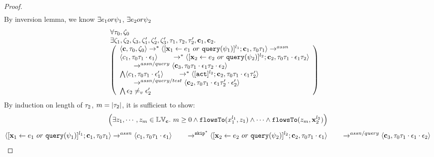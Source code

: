 \documentclass[a4paper,11pt]{article}
\begin{document}
\begin{proof}
\[\begin{array}{ll}
&
\end{array}
 \]
 By inversion lemma, we know $\exists e_1 or \psi_1$, $\exists e_2 or \psi_2$
 \[
\begin{array}{ll}
\begin{array}{l}
\forall \vtrace_0, \vcounter_0
\\
\exists \vcounter_1, \vcounter_2, \vcounter_3,
\vcounter_1', \vcounter_2', \vcounter_3', 
\vtrace_1, \vtrace_2, \vtrace_2', \ssa{c}_1, \ssa{c}_2.
\\
  \left(
  \begin{array}{l}   
\config{\ssa{c}, \vtrace_0, \vcounter_0} \rightarrow^{*} 
\config{[\assign{\ssa{x}_1}{\expr_1~ or ~ \query(\qexpr_1)}]^{l_1} ; \ssa{c}_1, \vtrace_0 \vtrace_1}  \rightarrow^{assn}
\\ 
 \config{c_1, \vtrace_0 \vtrace_1 \cdot \event_1} 
  \qquad \rightarrow^{*} 
  \config{[\assign{\ssa{x}_2}{\expr_2 ~ or ~ \query(\qexpr_2)}]^{l_2};\ssa{c}_2, 
  \vtrace_0 \vtrace_1 \cdot \event_1\vtrace_2} 
  \\
  \qquad \rightarrow^{assn/query} 
  \config{\ssa{c}_3,  \vtrace_0 \vtrace_1 \cdot \event_1 \vtrace_2 \cdot \event_2} 
 \\ 
 \bigwedge
 \config{c_1, \vtrace_0 \vtrace_1 \cdot \event_1'} 
  \qquad \rightarrow^{*} 
  \config{[\action]^{l_2} ; \ssa{c}_2, \vtrace_0 \vtrace_1 \cdot \event_1 \vtrace_2'} 
  \\
  \qquad \rightarrow^{assn/query/test} 
  \config{\ssa{c}_2,  \vtrace_0 \vtrace_1 \cdot \event_1 \vtrace_2' \cdot \event_2'} 
\\
\bigwedge
\event_2 \neq_{v} \event_2'
\end{array}
\right)
\end{array} 
&
\end{array}
 \]
 By induction on length of $\mathtt{\tau}_2$, $m = |\mathtt{\tau}_2|$, it is sufficient to show:
 \[\Big( \exists z_1, \cdots, z_m \in \mathbb{LV}_{{\boldsymbol{\mathbf{c}}}}. ~ m \geq 0 \land
	\mathtt{flowsTo}(x_1^{l_1}, z_1) 
	\land \cdots \land \mathtt{flowsTo}(z_m, {\boldsymbol{\mathbf{x}}}_2^{l_2}) \Big)
	\]
\[
	\langle [\mathrel{ {\boldsymbol{\mathbf{x}}}_1 \leftarrow e_1~ or ~ {\tt query}(\psi_1) }]^{l_1} ; {\boldsymbol{\mathbf{c}}}_1, \mathtt{\tau}_0 \mathtt{\tau}_1 \rangle  \rightarrow^{assn}
\\ 
 \langle c_1, \mathtt{\tau}_0 \mathtt{\tau}_1 \cdot \mathtt{\epsilon}_1 \rangle 
  \qquad \rightarrow^{\mathtt{skip}^*} 
  \langle [\mathrel{ {\boldsymbol{\mathbf{x}}}_2 \leftarrow e_2 ~ or ~ {\tt query}(\psi_2) }]^{l_2};{\boldsymbol{\mathbf{c}}}_2, 
  \mathtt{\tau}_0 \mathtt{\tau}_1 \cdot \mathtt{\epsilon}_1 \rangle 
  \\
  \qquad \rightarrow^{assn/query} 
  \langle {\boldsymbol{\mathbf{c}}}_3,  \mathtt{\tau}_0 \mathtt{\tau}_1 \cdot \mathtt{\epsilon}_1\cdot \mathtt{\epsilon}_2 \rangle 
\]
\end{proof}
\end{document}
